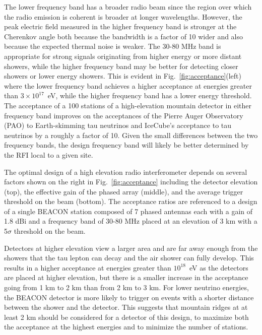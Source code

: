 \documentclass{PoS}
\begin{document}
The lower frequency band has a broader radio beam since the region over which the radio emission is coherent is broader at longer wavelengths. However, the peak electric field measured in the higher frequency band is stronger at the Cherenkov angle both because the bandwidth is a factor of 10 wider and also because the expected thermal noise is weaker. The 30-80 MHz band is appropriate for strong signals originating from higher energy or more distant showers, while the higher frequency band may be better for detecting closer showers or lower energy showers. This is evident in Fig.~\ref{fig:acceptance}(left) where the lower frequency band achieves a higher acceptance at energies greater than $3\times10^{17}$~eV, while the higher frequency band has a lower energy threshold.  The acceptance of a 100 stations of a high-elevation mountain detector in either frequency band improves on the acceptances of the Pierre Auger Observatory (PAO) to Earth-skimming tau neutrinos and IceCube's acceptance to tau neutrinos by a roughly a factor of 10. Given the small differences between the two frequency bands, the design frequency band will likely be better determined by the RFI local to a given site. 

The optimal design of a high elevation radio interferometer depends on several factors shown on the right in Fig.~\ref{fig:acceptance} including the detector elevation (top), the effective gain of the phased array (middle), and the average trigger threshold on the beam (bottom). The acceptance ratios are referenced to a design of a single BEACON station composed of 7 phased antennas each with a gain of 1.8 dBi and a frequency band of 30-80 MHz placed at an elevation of 3 km with a 5$\sigma$ threshold on the beam.

Detectors at higher elevation view a larger area and are far away enough from the showers that the tau lepton can decay and the air shower can fully develop. This results in a higher acceptance at energies greater than $10^{18}$~eV as the detectors are placed at higher elevation, but there is a smaller increase in the acceptance going from 1 km to 2 km than from 2 km to 3 km. For lower neutrino energies, the BEACON detector is more likely to trigger on events with a shorter distance between the shower and the detector. This suggests that mountain ridges at at least 2 km should be considered for a detector of this design, to maximize both the acceptance at the highest energies and to minimize the number of stations.
\end{document}
